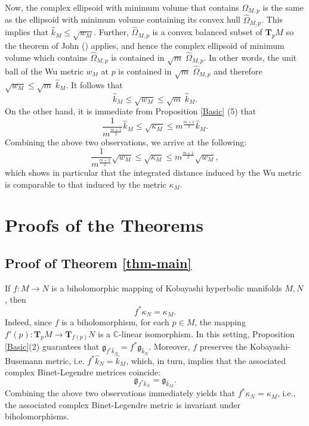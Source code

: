 \documentclass[a4paper,11pt,reqno]{amsart}
\theoremstyle{plain}
\theoremstyle{definition}
\theoremstyle{remark}
\theoremstyle{remark}
\numberwithin{equation}{section}
\begin{document}
Now, the complex ellipsoid with minimum volume that contains $ \Omega_{M,p} $ is the same as the ellipsoid with minimum volume containing its convex hull $ \hat{\Omega}_{M,p} $. This implies that $ \hat{k}_M \leq \sqrt{w_M}$. Further, $ \hat{\Omega}_{M,p} $  is a convex balanced subset of $ \textbf{T}_p M $ so the theorem of John (\cite{john,ball}) applies, and hence the complex ellipsoid of minimum volume which contains $ \hat{\Omega}_{M,p} $ is contained in $ \sqrt{m} \; \hat{\Omega}_{M,p} $. In other words, the unit ball of the Wu metric $ w_M $ at $ p $ is contained in $ \sqrt{m} \;\hat{\Omega}_{M,p} $ and therefore $\sqrt{w_M} \leq \sqrt{m} \; \hat{k}_M $. It follows that 
\begin{equation} \label{Wu}
\hat{k}_M \leq \sqrt{w_M} \leq \sqrt{m} \; \hat{k}_M.
\end{equation}
On the other hand, it is immediate from Proposition \ref{Basic} (5) that 
\[
\frac{1}{m^{\frac{m+1}{2}}} \hat{k}_M \leq \sqrt{{\kappa}_M} \leq {m^{\frac{m+1}{2}}}{\hat{k}_M}. 
\]
Combining the above two observations, we arrive at the following:
\[
\frac{1}{m^{\frac{m+2}{2}}} \sqrt{w_M} \leq \sqrt{{\kappa}_M} \leq {m^{\frac{m+1}{2}}}\sqrt{{w_M}}, 
\]
which shows in particular that the integrated distance induced by the Wu metric is comparable to that induced by the metric $\kappa_M$. 

\section{Proofs of the Theorems}
\subsection{Proof of Theorem \ref{thm-main}} 
If $ f: M \rightarrow N $ is a biholomorphic mapping of Kobayashi hyperbolic manifolds $ M, N $, then 
\[
f^* \kappa_N = \kappa_M.
\]
Indeed, since $ f $ is a biholomorphism, for each $ p \in M $, the mapping $ f'(p): \textbf{T}_p M \rightarrow \textbf{T}_{f(p)} N $ is a $ \mathbb{C} $-linear isomorphism. In this setting, Proposition \ref{Basic}\;(2) guarantees that $ \mathfrak{g}_{f^* \hat{k}_N} = f^*\mathfrak{g}_{ \hat{k}_N} $. Moreover, $ f $ preserves the Kobayashi-Busemann metric, i.e. $ f^* \hat{k}_N = \hat{k}_M $, which, in turn, implies that the associated complex Binet-Legendre metrices coincide:
\[
\mathfrak{g}_{f^* \hat{k}_N} = \mathfrak{g}_{ \hat{k}_M}.
\]
Combining the above two observations immediately yields that $ f^*\kappa_N = \kappa_M $, i.e., the associated complex Binet-Legendre metric is invariant under biholomorphisms.
\end{document}
